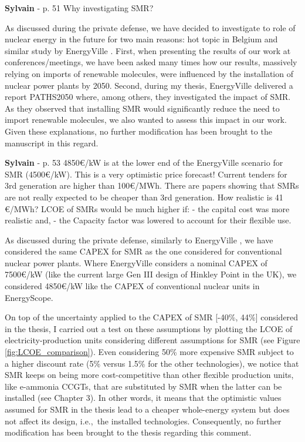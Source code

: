\documentclass[12pt,a4paper]{article}
\def\ie{i.e.,\ }
\begin{document}
\begin{mdframed}[style=comment] %
{\color{purple} \textbf{Sylvain}} - p. 51 Why investigating SMR?
\end{mdframed}

\noindent As discussed during the private defense, we have decided to investigate to role of nuclear energy in the future for two main reasons: hot topic in Belgium and similar study by EnergyVille \cite{PATHS2050}. First, when presenting the results of our work at conferences/meetings, we have been asked many times how our results, massively relying on imports of renewable molecules, were influenced by the installation of nuclear power plants by 2050. Second, during my thesis, EnergyVille delivered a report PATHS2050 where, among others, they investigated the impact of SMR. As they observed that installing SMR would significantly reduce the need to import renewable molecules, we also wanted to assess this impact in our work. Given these explanations, no further modification has been brought to the manuscript in this regard.

\begin{mdframed}[style=comment] %
{\color{purple} \textbf{Sylvain}} - p. 53 4850€/kW is at the lower end of the EnergyVille scenario for SMR (4500€/kW). This is a very optimistic price forecast! Current tenders for 3rd generation are higher than 100€/MWh. There are papers showing that SMRs are not really expected to be cheaper than 3rd generation. How realistic is 41 €/MWh? LCOE of SMRs would be much higher if: - the capital cost was more realistic and, - the Capacity factor was lowered to account for their flexible use.
\end{mdframed}

\noindent As discussed during the private defense, similarly to EnergyVille \cite{PATHS2050}, we have considered the same CAPEX for SMR as the one considered for conventional nuclear power plants. Where EnergyVille considers a nominal CAPEX of 7500€/kW (like the current large Gen III design of Hinkley Point in the UK), we considered 4850€/kW like the CAPEX of conventional nuclear units in EnergyScope. 

On top of the uncertainty applied to the CAPEX of SMR [-40\%, 44\%] considered in the thesis, I carried out a test on these assumptions by plotting the LCOE of electricity-production units considering different assumptions for SMR (see Figure \ref{fig:LCOE_comparison}). Even considering 50\% more expensive SMR subject to a higher discount rate (5\% versus 1.5\% for the other technologies), we notice that SMR keeps on being more cost-competitive than other flexible production units, like e-ammonia CCGTs, that are substituted by SMR when the latter can be installed (see Chapter 3). In other words, it means that the optimistic values assumed for SMR in the thesis lead to a cheaper whole-energy system but does not affect its design, \ie the installed technologies.  Consequently, no further modification has been brought to the thesis regarding this comment.
\end{document}
